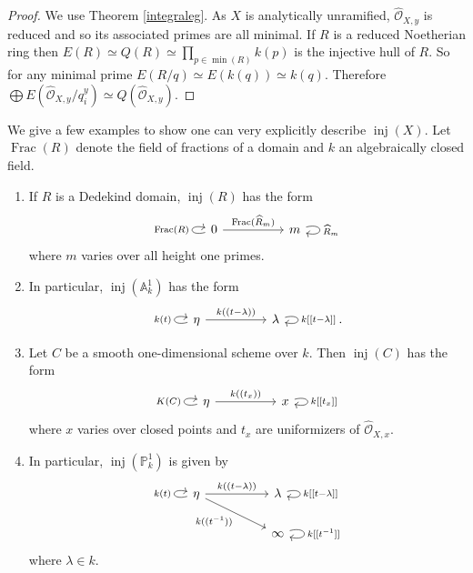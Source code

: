 \documentclass[12pt,oneside]{amsart}
\DeclareMathOperator{\inj}{inj}
\DeclareMathOperator{\Frac}{Frac}
\begin{document}
\begin{proof}
We use Theorem \ref{integraleg}. As $X$ is analytically unramified, $\widehat{\mathcal{O}}_{X,y}$ is reduced and so its associated primes are all minimal. If $R$ is a reduced Noetherian ring then $E(R) \simeq Q(R) \simeq \prod_{p \in \min(R)} k(p)$ is the injective hull of $R$. So for any minimal prime $E(R/q) \simeq E(k(q)) \simeq k(q)$. Therefore $\bigoplus E(\widehat{\mathcal{O}}_{X,y}/q_i^y) \simeq Q(\widehat{\mathcal{O}}_{X,y})$. 
\end{proof}




\begin{ex} \label{injegslist}
We give a few examples to show one can very explicitly describe $\inj(X)$. Let $\Frac(R)$ denote the field of fractions of a domain and $k$ an algebraically closed field. 
\begin{enumerate}
\item If $R$ is a Dedekind domain, $\inj(R)$ has the form
\[
\begin{tikzcd}[column sep = huge]
0 \arrow[r,"\Frac(\widehat{R}_m)  "] \arrow[loop left,"\Frac(R)"] & m \arrow[loop right, "\widehat{R}_m"]
\end{tikzcd}
\]
where $m$ varies over all height one primes. 

\item In particular, $\inj(\mathbb{A}^1_k)$ has the form
\[
\begin{tikzcd}[column sep = huge]
\eta \arrow[r,"{k((t- \lambda))}"] \arrow[loop left,"k(t)"] & \lambda \arrow[loop right, "{k[[t-\lambda]]}"] 
\end{tikzcd}.
\]

\item Let $C$ be a smooth one-dimensional scheme over $k$. Then $\inj(C)$ has the form 
\[
\begin{tikzcd}[column sep = huge]
\eta \arrow[r,"{k((t_x))}"] \arrow[loop left,"K(C)"] & x \arrow[loop right, "{k[[t_x]]}"]
\end{tikzcd}
\]
where $x$ varies over closed points and $t_x$ are uniformizers of $\widehat{\mathcal{O}}_{X,x}$. 

\item In particular, $\inj(\mathbb{P}^1_k)$ is given by
\[
\begin{tikzcd}[column sep = huge]
\eta \arrow[r,"{k((t- \lambda))}"] \arrow[loop left,"k(t)"] \arrow[dr,"{k((t^{-1}))}",swap] & \lambda \arrow[loop right, "{k[[t-\lambda]]}"]  \\
& \infty \arrow[loop right, "{k[[t^{-1}]]}"] 
\end{tikzcd}
\]
where $\lambda \in k$.
\end{enumerate}
\end{ex}
\end{document}

